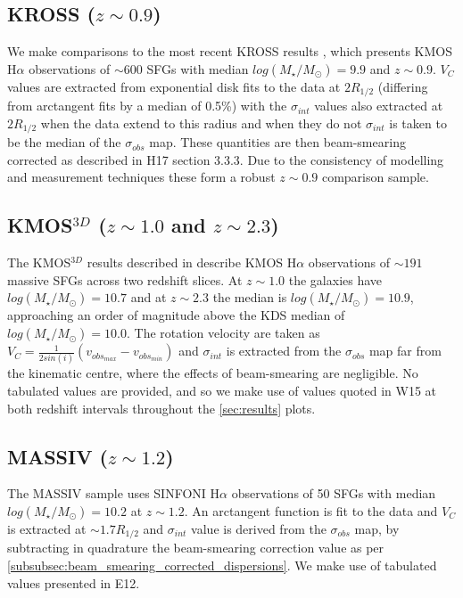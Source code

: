 \documentclass[fleqn,usenatbib]{mn2e}
\begin{document}
\subsection{KROSS ($z\sim0.9$)}\label{subsec:KROSS}
We make comparisons to the most recent KROSS results \citep[H17]{Harrison2017}, which presents KMOS H$\alpha$ observations of $\sim600$ SFGs with median $log(M_{\star}/M_{\odot})=9.9$ and $z\sim0.9$.
$V_{C}$ values are extracted from exponential disk fits to the data at $2R_{1/2}$ (differing from arctangent fits by a median of 0.5\%) with the $\sigma_{int}$ values also extracted at $2R_{1/2}$ when the data extend to this radius and when they do not $\sigma_{int}$ is taken to be the median of the $\sigma_{obs}$ map.
These quantities are then beam-smearing corrected as described in H17 section 3.3.3. 
Due to the consistency of modelling and measurement techniques these form a robust $z\sim0.9$ comparison sample.

\subsection{KMOS$^{3D}$ ($z\sim1.0$ and $z\sim2.3$)}\label{subsec:kmos_3d}
The KMOS$^{3D}$ results described in \cite[W15]{Wisnioski2015} describe KMOS H$\alpha$ observations of $\sim191$ massive SFGs across two redshift slices. 
At $z \sim 1.0$ the galaxies have $log(M_{\star}/M_{\odot})=10.7$ and at $z \sim 2.3$ the median is $log(M_{\star}/M_{\odot})=10.9$, approaching an order of magnitude above the KDS median of $log(M_{\star}/M_{\odot})=10.0$.   The rotation velocity are taken as $V_{C} = \frac{1}{2sin(i)}(v_{obs_{max}} - v_{obs_{min}})$ and $\sigma_{int}$ is extracted from the $\sigma_{obs}$ map far from the kinematic centre, where the effects of beam-smearing are negligible.
No tabulated values are provided, and so we make use of values quoted in W15 at both redshift intervals throughout the \cref{sec:results} plots.

\subsection{MASSIV ($z\sim1.2$)}\label{subsec:MASSIV}
The MASSIV sample \citep[E12]{Epinat2012} uses SINFONI H$\alpha$ observations of 50 SFGs with median $log(M_{\star}/M_{\odot})=10.2$ at $z\sim1.2$.
An arctangent function is fit to the data and $V_{C}$ is extracted at $\sim1.7R_{1/2}$ and $\sigma_{int}$ value is derived from the $\sigma_{obs}$ map, by subtracting in quadrature the beam-smearing correction value as per \cref{subsubsec:beam_smearing_corrected_dispersions}.
We make use of tabulated values presented in E12.
\end{document}
